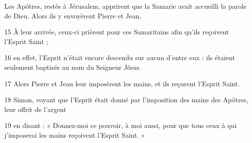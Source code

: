 Les Apôtres, restés à Jérusalem, apprirent que la Samarie avait accueilli la parole de Dieu. Alors ils y envoyèrent Pierre et Jean.

15 À leur arrivée, ceux-ci prièrent pour ces Samaritains afin qu’ils reçoivent l’Esprit Saint ;

16 en effet, l’Esprit n’était encore descendu sur aucun d’entre eux : ils étaient seulement baptisés au nom du Seigneur Jésus.

17 Alors Pierre et Jean leur imposèrent les mains, et ils reçurent l’Esprit Saint.

18 Simon, voyant que l’Esprit était donné par l’imposition des mains des Apôtres, leur offrit de l’argent

19 en disant : « Donnez-moi ce pouvoir, à moi aussi, pour que tous ceux à qui j’imposerai les mains reçoivent l’Esprit Saint. »